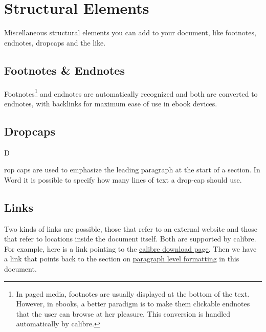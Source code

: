 \documentclass[11pt]{article}
\begin{document}
\section[{Structural Elements}]{\protect\textcolor{hex365F91}{Structural Elements}}\label{_Toc54889875}\label{structural-elements}

Miscellaneous structural elements you can add to your document, like footnotes, endnotes, dropcaps and the like.

\subsection[{Footnotes \& Endnotes}]{\protect\textcolor{hex4F81BD}{Footnotes \& Endnotes}}\label{_Toc201580556}\label{footnotes-endnotes}

Footnotes\footnote{In paged media, footnotes are usually displayed at the bottom of the text. However, in ebooks, a better paradigm is to make them clickable endnotes that the user can browse at her pleasure. This conversion is handled automatically by calibre.} and endnotes are automatically recognized and both are converted to endnotes, with backlinks for maximum ease of use in ebook devices.

\subsection[{Dropcaps}]{\protect\textcolor{hex4F81BD}{Dropcaps}}\label{_Toc1977424358}\label{dropcaps}

{\fontsize{58.5pt}{70.2pt}\selectfont D}

rop caps are used to emphasize the leading paragraph at the start of a section. In Word it is possible to specify how many lines of text a drop-cap should use.

\subsection[{Links}]{\protect\textcolor{hex4F81BD}{Links}}\label{_Toc1233048813}\label{links}

Two kinds of links are possible, those that refer to an external website and those that refer to locations inside the document itself. Both are supported by calibre. For example, here is a link pointing to the \href{http://calibre-ebook.com/download}{\textcolor{hex0000FF}{\uline{calibre download page}}}. Then we have a link that points back to the section on \hyperref[_Paragraph_level_formatting]{\textcolor{hex0000FF}{\uline{paragraph level formatting}}} in this document.
\end{document}

